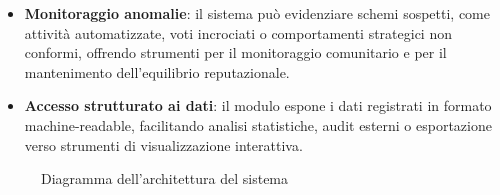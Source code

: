 \begin{itemize}
                \item \textbf{Monitoraggio anomalie}: il sistema può evidenziare schemi sospetti, come attività automatizzate, voti incrociati o comportamenti strategici non conformi, offrendo strumenti per il monitoraggio comunitario e per il mantenimento dell'equilibrio reputazionale.
            
                \item \textbf{Accesso strutturato ai dati}: il modulo espone i dati registrati in formato machine-readable, facilitando analisi statistiche, audit esterni o esportazione verso strumenti di visualizzazione interattiva. \\
            \end{itemize}

    \begin{figure}[H]
        
        \caption{Diagramma dell'architettura del sistema}
        \label{fig:architettura}
    \end{figure}
    
